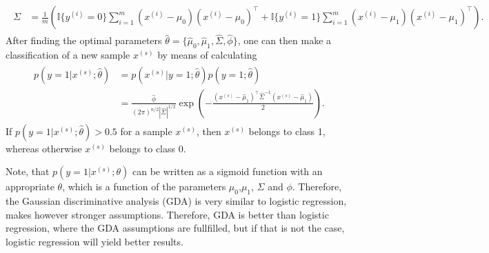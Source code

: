 \documentclass[a4paper,11pt]{article}
\numberwithin{equation}{section}
\begin{document}
{\begin{align}
\begin{aligned}
	\Sigma &= \frac{1}{m}\left(\mathbb{I}\{y^{(i)}=0\}\sum_{i=1}^{m}(x^{(i)}-\mu_0)(x^{(i)}-\mu_0)^\top+   \mathbb{I}\{y^{(i)}=1\}\sum_{i=1}^{m}(x^{(i)}-\mu_1)(x^{(i)}-\mu_1)^\top\right).
\end{aligned} 
\end{align} After finding the optimal parameters $\hat{\theta} = \{\hat{\mu}_0, \hat{\mu}_1, \hat{\Sigma}, \hat{\phi}\}$, one can then make a classification of a new sample $x^{(s)}$ by means of calculating
\begin{align}\begin{aligned}
	p(y=1|x^{(s)};\hat{\theta}) &= p(x^{(s)}|y=1; \hat{\theta})p(y=1;\hat{\theta}) \\
	&=\frac{\hat{\phi}}{(2\pi)^{n/2}|\hat{\Sigma}|^{1/2}}\exp\left({-\frac{(x^{(s)}-\hat{\mu}_1)^\top \hat{\Sigma}^{-1}(x^{(s)}-\hat{\mu}_1)}{2}}\right).
\end{aligned}\end{align} If $p(y=1|x^{(s)};\hat{\theta}) > 0.5$ for a sample $x^{(s)}$, then $x^{(s)}$ belongs to class 1, whereas otherwise $x^{(s)}$ belongs to class 0.

Note, that $p(y=1|x^{(s)};\theta)$ can be written as a sigmoid function with an appropriate $\theta$, which is a function of the parameters $\mu_0$,$\mu_1$, $\Sigma$ and $\phi$. Therefore, the Gaussian discriminative analysis (GDA) is very similar to logistic regression, makes however stronger assumptions. Therefore, GDA is better than logistic regression, where the GDA assumptions are fullfilled, but if that is not the case, logistic regression will yield better results.
}
\end{document}
